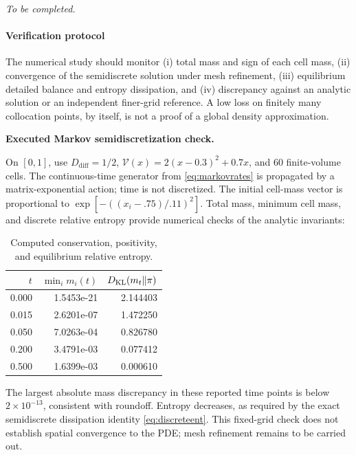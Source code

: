 \documentclass[12pt,a4paper,oneside]{book}
\begin{document}
\noindent\textit{To be completed.}


\paragraph{Verification protocol}
The numerical study should monitor (i) total mass and sign of each cell
mass, (ii) convergence of the semidiscrete solution under mesh refinement,
(iii) equilibrium detailed balance and entropy dissipation, and
(iv) discrepancy against an analytic solution or an independent finer-grid
reference. A low loss on finitely many collocation points, by itself, is not
a proof of a global density approximation.

\medskip\noindent\textbf{Executed Markov semidiscretization check.}\par
On $[0,1]$, use ${D_{\mathrm{diff}}}=1/2$, $\mathcal V(x)=2(x-0.3)^2+0.7x$, and 60 finite-volume
cells. The continuous-time generator from \eqref{eq:markovrates} is
propagated by a matrix-exponential action; time is not discretized.
The initial cell-mass vector is proportional to
$\exp[-((x_i-.75)/.11)^2]$. Total mass, minimum cell mass, and
discrete relative entropy provide numerical checks of the analytic invariants:
\begin{table}[htbp]\centering\small
\caption{Computed conservation, positivity, and equilibrium relative entropy.}
\label{tab:markov-validation}
\begin{tabular}{@{}rrr@{}}\toprule
$t$ & $\min_i m_i(t)$ & $D_{\mathrm{KL}}(m_t\Vert\pi)$\\\midrule
0.000 & 1.5453e-21 & 2.144403 \\
0.015 & 2.6201e-07 & 1.472250 \\
0.050 & 7.0263e-04 & 0.826780 \\
0.200 & 3.4791e-03 & 0.077412 \\
0.500 & 1.6399e-03 & 0.000610 \\
\bottomrule\end{tabular}\end{table}
The largest absolute mass discrepancy in these reported time points is
below $2\times10^{-13}$, consistent with roundoff. Entropy decreases,
as required by the exact semidiscrete dissipation identity
\eqref{eq:discreteent}. This fixed-grid check does not establish spatial
convergence to the PDE; mesh refinement remains to be carried out.
\FloatBarrier

\end{document}
